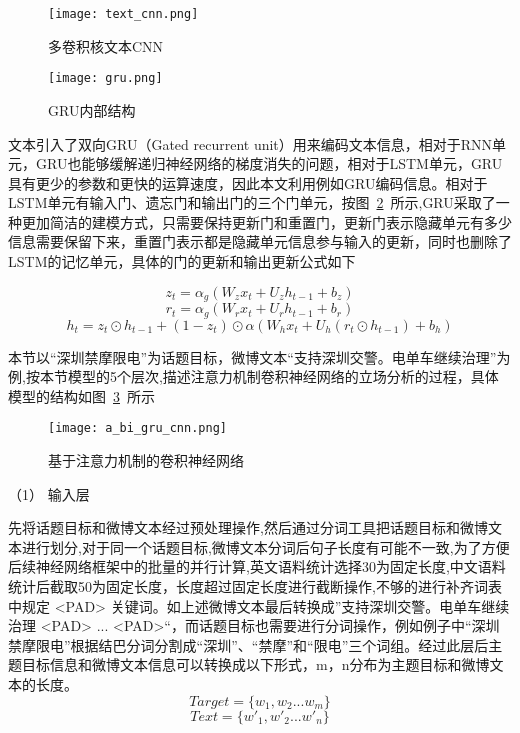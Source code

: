 \begin{figure}[htbp]
	\centering
	\texttt{[image: text\_cnn.png]}
	\caption{多卷积核文本CNN}
	\label{multiCNN}
\end{figure}

\begin{figure}[htbp]
	\centering
	\texttt{[image: gru.png]}
	\caption[rnn_vanish]{GRU内部结构}
	\label{gru}
\end{figure}
文本引入了双向GRU（Gated recurrent unit）用来编码文本信息，相对于RNN单元，GRU也能够缓解递归神经网络的梯度消失的问题，相对于LSTM单元，GRU具有更少的参数和更快的运算速度，因此本文利用例如GRU编码信息。相对于LSTM单元有输入门、遗忘门和输出门的三个门单元，按图~\ref{gru}~所示,GRU采取了一种更加简洁的建模方式，只需要保持更新门和重置门，更新门表示隐藏单元有多少信息需要保留下来，重置门表示都是隐藏单元信息参与输入的更新，同时也删除了LSTM的记忆单元，具体的门的更新和输出更新公式如下

\begin{equation}\label{conv1} z_t=\alpha_g(W_zx_t+U_zh_{t-1}+b_z) \end{equation}
\begin{equation}\label{conv1} r_t=\alpha_g(W_rx_t+U_rh_{t-1}+b_r) \end{equation}
\begin{equation}\label{conv1} h_t=z_t\odot h_{t-1} + (1-z_t)\odot \alpha(W_hx_t+U_h(r_t\odot h_{t-1})+b_h) \end{equation}



本节以“深圳禁摩限电”为话题目标，微博文本“支持深圳交警。电单车继续治理”为例,按本节模型的5个层次,描述注意力机制卷积神经网络的立场分析的过程，具体模型的结构如图~\ref{GRU_CNN}~所示

\begin{figure}[htbp]
	\centering
	\texttt{[image: a\_bi\_gru\_cnn.png]}
	\caption[]{基于注意力机制的卷积神经网络}
	\label{GRU_CNN}
\end{figure}

（1） 输入层

先将话题目标和微博文本经过预处理操作,然后通过分词工具把话题目标和微博文本进行划分,对于同一个话题目标,微博文本分词后句子长度有可能不一致,为了方便后续神经网络框架中的批量的并行计算,英文语料统计选择30为固定长度,中文语料统计后截取50为固定长度，长度超过固定长度进行截断操作,不够的进行补齐词表中规定 <PAD> 关键词。如上述微博文本最后转换成”支持深圳交警。电单车继续治理 <PAD> ... <PAD>“，而话题目标也需要进行分词操作，例如例子中“深圳禁摩限电”根据结巴分词分割成“深圳”、“禁摩”和“限电”三个词组。经过此层后主题目标信息和微博文本信息可以转换成以下形式，m，n分布为主题目标和微博文本的长度。
\begin{equation}\label{target_info} Target= \lbrace w_1,w_2...w_m\rbrace \end{equation}
\begin{equation}\label{text_info} Text=\lbrace w'_1,w'_2...w'_n\rbrace  \end{equation}

